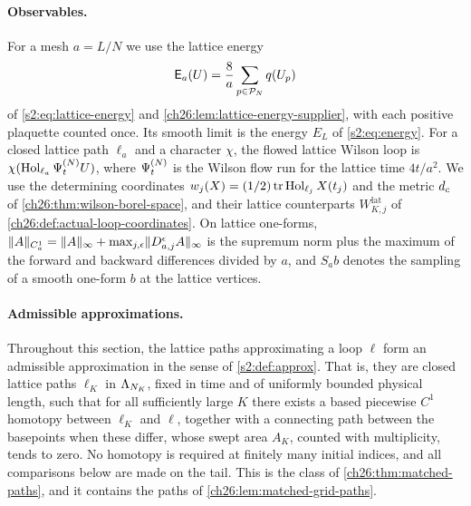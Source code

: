 \paragraph{Observables.}
For a mesh $a=L/N$ we use the lattice energy
\[
 \mathsf E_a(U)=\frac8a\sum_{p\in\mathcal P_{N}}q(U_p)
\]
of \eqref{s2:eq:lattice-energy} and \cref{ch26:lem:lattice-energy-supplier}, with each positive plaquette counted once. Its smooth limit is the energy $E_L$ of \eqref{s2:eq:energy}. For a closed lattice path $\ell_a$ and a character $\chi$, the flowed lattice Wilson loop is $\chi(\operatorname{Hol}_{\ell_a}\Psi^{(N)}_tU)$, where $\Psi^{(N)}_t$ is the Wilson flow run for the lattice time $4t/a^2$. We use the determining coordinates $w_j(X)=(1/2)\operatorname{tr}\operatorname{Hol}_{\ell_j}X(t_j)$ and the metric $d_c$ of \cref{ch26:thm:wilson-borel-space}, and their lattice counterparts $W^{\mathrm{lat}}_{K,j}$ of \cref{ch26:def:actual-loop-coordinates}. On lattice one-forms, $\lVert A\rVert_{C_a^1}=\lVert A\rVert_\infty+\max_{j,\epsilon}\lVert D^\epsilon_{a,j}A\rVert_\infty$ is the supremum norm plus the maximum of the forward and backward differences divided by $a$, and $S_ab$ denotes the sampling of a smooth one-form $b$ at the lattice vertices.

\paragraph{Admissible approximations.}
Throughout this section, the lattice paths approximating a loop $\ell$ form an admissible approximation in the sense of \cref{s2:def:approx}. That is, they are closed lattice paths $\ell_K$ in $\Lambda_{N_K}$, fixed in time and of uniformly bounded physical length, such that for all sufficiently large $K$ there exists a based piecewise $C^1$ homotopy between $\ell_K$ and $\ell$, together with a connecting path between the basepoints when these differ, whose swept area $A_K$, counted with multiplicity, tends to zero. No homotopy is required at finitely many initial indices, and all comparisons below are made on the tail. This is the class of \cref{ch26:thm:matched-paths}, and it contains the paths of \cref{ch26:lem:matched-grid-paths}.

